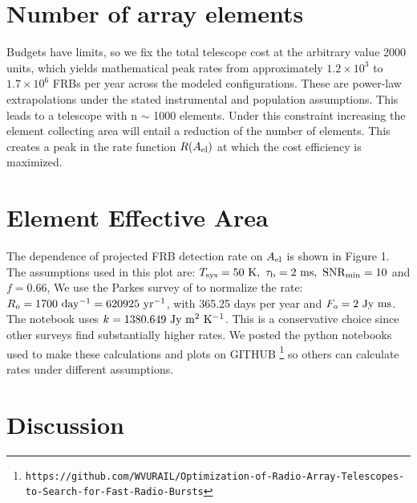 \documentclass[fleqn,usenatbib]{mnras}
\begin{document}
\section{Number of array elements}

Budgets have limits, so we fix the total telescope cost at the arbitrary value 2000 units, which yields mathematical peak rates from approximately $1.2\times10^3$ to $1.7\times10^6$ FRBs per year across the modeled configurations. These are power-law extrapolations under the stated instrumental and population assumptions. This leads to a telescope with n $\sim$ 1000 elements. Under this constraint increasing the element collecting area will entail a reduction of the number of elements. This creates a peak in the rate function $R(A_{\rm{el}})$ at which the cost efficiency is maximized.

\section{Element Effective Area}

The dependence of projected FRB detection rate on $A_{\rm{el}}$ is shown in Figure 1. The assumptions used in this plot are: $T_{\rm{sys}}= 50~\rm{K},~ \tau_b = 2~\rm{ms},~ SNR_{min}=10$ and $f=0.66$, We use the Parkes survey of \citet{parkes2018} to normalize the rate: $R_o=1700~\rm{day^{-1}}=620925~\rm{yr^{-1}}$, with 365.25 days per year and $F_o=2~\rm{Jy~ms}$. The notebook uses $k=1380.649~\rm{Jy~m^2~K^{-1}}$. This is a conservative choice since other surveys find substantially higher rates. We posted the python notebooks used to make these calculations and plots on GITHUB \footnote{\texttt{https://github.com/WVURAIL/Optimization-of-Radio-Array-Telescopes-to-Search-for-Fast-Radio-Bursts} } so others can calculate rates under different assumptions.

\section{Discussion}
\end{document}
